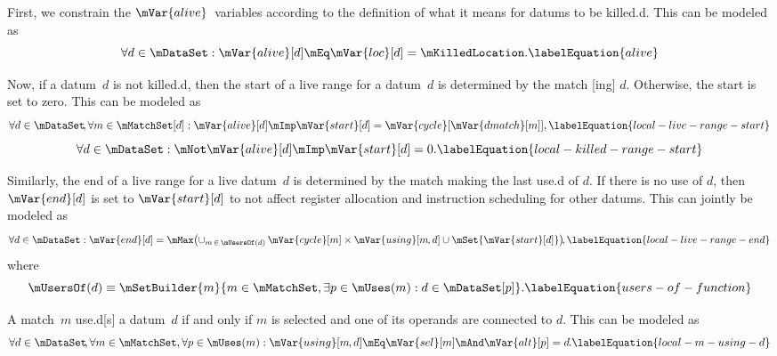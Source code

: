 First, we constrain the $\mVar{alive}$~\glspl{variable} according to the
definition of what it means for \glspl{datum} to be \gls{killed.d}.
%
This can be modeled as
%
\begin{equation}
  \forall d \in \mDataSet :
  \mVar{alive}[d]
  \mEq
  \mVar{loc}[d] = \mKilledLocation.
  \labelEquation{alive}
\end{equation}

Now, if a \gls{datum}~$d$ is not \gls{killed.d}, then the start of a \gls{live
  range} for a \gls{datum}~$d$ is determined by the \gls{match}
[ing] $d$\hspace{-.8pt}.
%
Otherwise, the start is set to zero.
%
This can be modeled as
%
\begin{equation}
  \forall d \in \mDataSet \!,
  \forall m \in \mMatchSet[d] :
  \mVar{alive}[d]
  \mImp
  \mVar{start}[d] = \mVar{cycle}[\mVar{dmatch}[m]],
  \labelEquation{local-live-range-start}
\end{equation}
%
\begin{equation}
  \forall d \in \mDataSet :
  \mNot\mVar{alive}[d]
  \mImp
  \mVar{start}[d] = 0.
  \labelEquation{local-killed-range-start}
\end{equation}

Similarly, the end of a \gls{live range} for a live \gls{datum}~$d$ is
determined by the \gls{match} making the last \gls{use.d} of $d$\hspace{-.8pt}.
%
If there is no use of $d$, then $\mVar{end}[d]$ is set to $\mVar{start}[d]$ to
not affect \gls{register allocation} and \gls{instruction scheduling} for other
\glspl{datum}.
%
This can jointly be modeled as
%
\begin{equation}
  \forall d \in \mDataSet :
  \mVar{end}[d] =
  \mMax\!
  \left(
    \cup_{m \,\in\, \mUsersOf(d)} \,
    \mVar{cycle}[m]
    \times
    \mVar{using}[m \hspace{-.8pt}, d]
    \cup
    \mSet{\mVar{start}[d]}
  \right)\!\!,
  \labelEquation{local-live-range-end}
\end{equation}
%
where
%
\begin{equation}
  \mUsersOf(d)
  \equiv
  \mSetBuilder{m}%
              {
                m \in \mMatchSet,
                \exists p \in \mUses(m) :
                d \in \mDataSet[p]
              }.
  \labelEquation{users-of-function}
\end{equation}

A \gls{match}~$m$ \gls{use.d}[s] a \gls{datum}~$d$ if and only if $m$ is
selected and one of its \glspl{operand} are connected to $d$\hspace{-.8pt}.
%
This can be modeled as
%
\begin{equation}
  \forall d \in \mDataSet \!,
  \forall m \in \mMatchSet,
  \forall p \in \mUses(m) :
  \mVar{using}[m \hspace{-.8pt}, d]
  \mEq
  \mVar{sel}[m] \mAnd \mVar{alt}[p] = d \hspace{-.8pt}.
  \labelEquation{local-m-using-d}
\end{equation}

